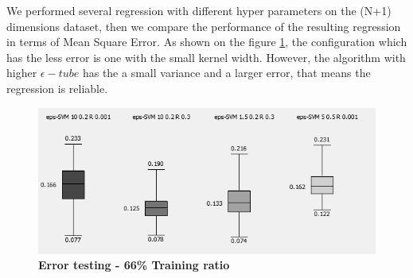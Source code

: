 We performed several regression with different hyper parameters on the (N+1) dimensions dataset, then we compare the performance of the resulting regression in terms of Mean Square Error. 
As shown on the figure \ref{fig:quantitative_svr}, the configuration which has the less error is one with the small kernel width. However, the algorithm with higher $\epsilon-tube$ has the a small variance and a larger error, that means the regression is reliable.
\begin{figure}[!ht]
\centering
\includegraphics[height=0.08\textheight]{./regression/MSE_quantitative_66.png}
\caption{\bf Error testing - 66\% Training ratio}
\label{fig:quantitative_svr}
\end{figure}
